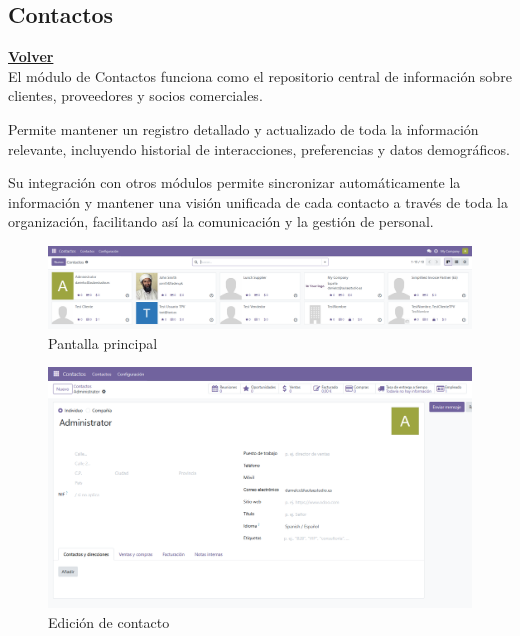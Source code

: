 \documentclass[a4paper,12pt]{article}
\begin{document}
\clearpage

\subsection{Contactos}
\hyperlink{anchor-indice}{\textbf{Volver}}\\

El módulo de Contactos funciona como el repositorio central de información sobre clientes, proveedores y socios comerciales.

Permite mantener un registro detallado y actualizado de toda la información relevante, incluyendo historial de interacciones, preferencias y datos demográficos.

Su integración con otros módulos permite sincronizar automáticamente la información y mantener una visión unificada de cada contacto a través de toda la organización, facilitando así la comunicación y la gestión de personal.

\begin{figure}[h!]
    \centering
    \includegraphics[width=1\textwidth]{pr2odoo62-pantallaPrincipal.png}
    \caption{Pantalla principal}
\end{figure}
\FloatBarrier

\begin{figure}[h!]
    \centering
    \includegraphics[width=1\textwidth]{pr2odoo63-edicionContacto.png}
    \caption{Edición de contacto}
\end{figure}
\FloatBarrier
\end{document}
